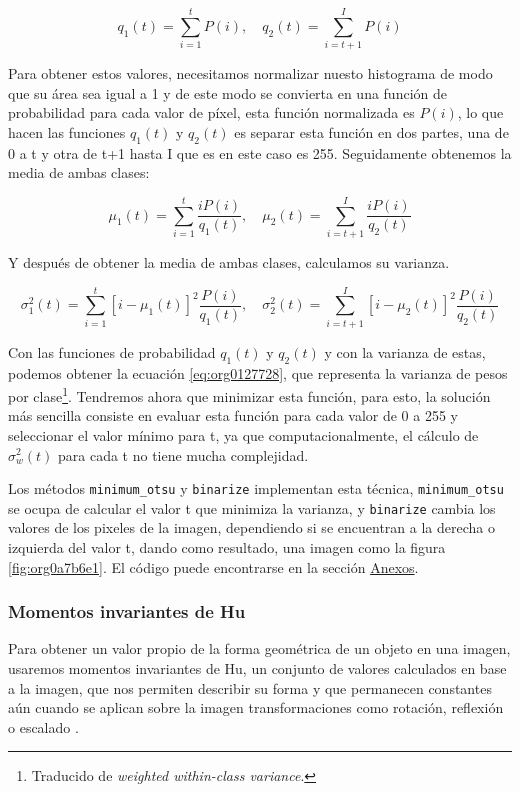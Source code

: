 \documentclass[letter]{article}
\begin{document}
$$ q_1(t) = \sum_{i=1}^t P(i), \quad q_2(t) = \sum_{i=t+1}^I P(i) $$

Para obtener estos valores, necesitamos normalizar nuesto histograma de modo que
su área sea igual a 1 y de este modo se convierta en una función de probabilidad
\cite{Smith1979} para cada valor de píxel, esta función normalizada es \(P(i)\),
lo que hacen las funciones \(q_1(t)\) y \(q_2(t)\) es separar esta función en dos
partes, una de 0 a t y otra de t+1 hasta I que es en este caso es 255.
Seguidamente obtenemos la media de ambas clases:

$$ \mu_1(t) = \sum_{i=1}^t \frac{i P(i)}{q_1(t)} , \quad \mu_2(t) = \sum_{i=t+1}^I \frac{i P(i)}{q_2(t)} $$

Y después de obtener la media de ambas clases, calculamos su varianza.

$$ \sigma_1^2(t) = \sum_{i=1}^t [i-\mu_1(t)]^2 \frac{P(i)}{q_1(t)} , \quad \sigma_2^2(t) = \sum_{i=t+1}^I [i-\mu_2(t)]^2 \frac{P(i)}{q_2(t)} $$

Con las funciones de probabilidad \(q_1(t)\) y \(q_2(t)\) y con la varianza de
estas, podemos obtener la ecuación \ref{eq:org0127728}, que representa la varianza de
pesos por clase\footnote{Traducido de \emph{weighted within-class variance}.}. Tendremos ahora que minimizar esta función,
para esto, la solución más sencilla consiste en evaluar esta función para cada
valor de 0 a 255 y seleccionar el valor mínimo para t, ya que
computacionalmente, el cálculo de \(\sigma_w^2(t)\) para cada t no tiene mucha
complejidad.

Los métodos \texttt{minimum\_otsu} y \texttt{binarize} implementan esta técnica, \texttt{minimum\_otsu}
se ocupa de calcular el valor t que minimiza la varianza, y \texttt{binarize} cambia
los valores de los pixeles de la imagen, dependiendo si se encuentran a la
derecha o izquierda del valor t, dando como resultado, una imagen como la figura
\ref{fig:org0a7b6e1}. El código puede encontrarse en la sección \hyperref[sec:orga14eedd]{Anexos}.

\subsubsection{Momentos invariantes de Hu}
\label{sec:org48ede60}
Para obtener un valor propio de la forma geométrica de un objeto en una imagen,
usaremos momentos invariantes de Hu, un conjunto de valores calculados en base a
la imagen, que nos permiten describir su forma y que permanecen constantes aún
cuando se aplican sobre la imagen transformaciones como rotación, reflexión o
escalado \cite{Hu1962}.
\end{document}
